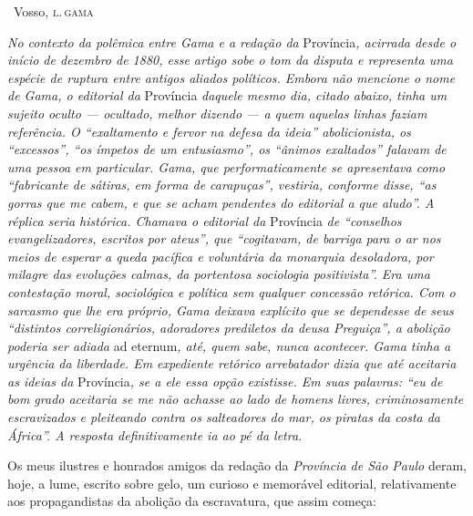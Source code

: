 \medskip

\hfill\ Vosso, \textsc{l.\,gama}


\begin{resumo}
\emph{No contexto da polêmica entre Gama e a redação da}
Província\emph{, acirrada desde o início de dezembro de 1880, esse
artigo sobe o tom da disputa e representa uma espécie de ruptura entre
antigos aliados políticos. Embora não mencione o nome de Gama, o
editorial da} Província \emph{daquele mesmo dia, citado abaixo, tinha um
sujeito oculto --- ocultado, melhor dizendo --- a quem aquelas linhas
faziam referência. O ``exaltamento e fervor na defesa da ideia''
abolicionista, os ``excessos'', ``os ímpetos de um entusiasmo'', os ``ânimos
exaltados'' falavam de uma pessoa em particular. Gama, que
performaticamente se apresentava como ``fabricante de sátiras, em forma
de carapuças'', vestiria, conforme disse, ``as gorras que me cabem, e que
se acham pendentes do editorial a que aludo''. A réplica seria histórica.
Chamava o editorial da} Província \emph{de ``conselhos evangelizadores,
escritos por ateus'', que ``cogitavam, de barriga para o ar nos meios de
esperar a queda pacífica e voluntária da monarquia desoladora, por
milagre das evoluções calmas, da portentosa sociologia positivista''. Era
uma contestação moral, sociológica e política sem qualquer concessão
retórica. Com o sarcasmo que lhe era próprio, Gama deixava explícito que
se dependesse de seus ``distintos correligionários, adoradores prediletos
da deusa Preguiça'', a abolição poderia ser adiada} ad eternum\emph{,
até, quem sabe, nunca acontecer. Gama tinha a urgência da liberdade. Em
expediente retórico arrebatador dizia que até aceitaria as ideias da}
Província\emph{, se a ele essa opção existisse. Em suas palavras: ``eu de
bom grado aceitaria se me não achasse ao lado de homens livres,
criminosamente escravizados e pleiteando contra os salteadores do mar,
os piratas da costa da África''. A resposta definitivamente ia ao pé da
letra. }
\end{resumo}

Os meus ilustres e honrados amigos da redação da \emph{Província de São
Paulo} deram, hoje, a lume, escrito sobre gelo, um curioso e memorável
editorial, relativamente aos propagandistas da abolição da escravatura,
que assim começa:

